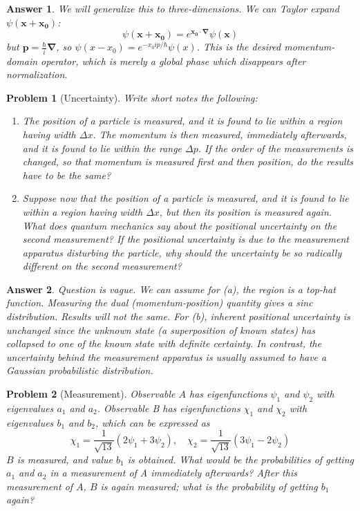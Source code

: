 \documentclass[a4paper]{article}
\newtheorem{ans}{Answer}[section]
\theoremstyle{new}
\newtheorem{qns}{Problem}[section]
\begin{document}
\begin{ans}
We will generalize this to three-dimensions. We can Taylor expand $\psi(\mathbf{x}+\mathbf{x_0})$:
$$\psi(\mathbf{x}+\mathbf{x_0})=e^{\mathbf{x_0}\cdot\boldsymbol{\nabla}}\psi(\mathbf{x})$$
but $\mathbf{p}=\frac{\hbar}{i}\boldsymbol{\nabla}$, so $\psi(x-x_0)=e^{-x_0ip/\hbar}\psi(x)$. This is the desired momentum-domain operator, which is merely a global phase which disappears after normalization.
\end{ans}
\begin{qns}[Uncertainty]
Write short notes the following:
\begin{enumerate}[label=(\alph*)]
\item The position of a particle is measured, and it is found to lie within a region having width $\Delta x$. The momentum is then measured, immediately afterwards, and it is found to lie within the range $\Delta p$. If the order of the measurements is changed, so that momentum is measured first and then position, do the results have to be the same?
\item Suppose now that the position of a particle is measured, and it is found to lie within a region having width $\Delta x$, but then its position is measured again. What does quantum mechanics say about the positional uncertainty on the second measurement? If the positional uncertainty is due to the measurement apparatus disturbing the particle, why should the uncertainty be so radically different on the second measurement?
\end{enumerate}
\end{qns}
\begin{ans}
Question is vague. We can assume for (a), the region is a top-hat function. Measuring the dual (momentum-position) quantity gives a sinc distribution. Results will not the same. For (b), inherent positional uncertainty is unchanged since the unknown state (a superposition of known states) has collapsed to one of the known state with definite certainty. In contrast, the uncertainty behind the measurement apparatus is usually assumed to have a Gaussian probabilistic distribution. 
\end{ans}
\newpage
\begin{qns}[Measurement]
Observable $A$ has eigenfunctions $\psi_1$ and  $\psi_2$ with eigenvalues $a_1$ and $a_2$. Observable B has eigenfunctions $\chi_1$ and $\chi_2$ with eigenvalues $b_1$ and $b_2$, which can be expressed as
$$\chi_1=\frac{1}{\sqrt{13}}(2\psi_1+3\psi_2),\quad \chi_2=\frac{1}{\sqrt{13}}(3\psi_1-2\psi_2)$$
$B$ is measured, and value $b_1$ is obtained. What would be the probabilities of getting $a_1$ and $a_2$ in a measurement of A immediately afterwards? After this measurement of $A$, $B$ is again measured; what is the probability of getting $b_1$ again?
\end{qns}
\end{document}
